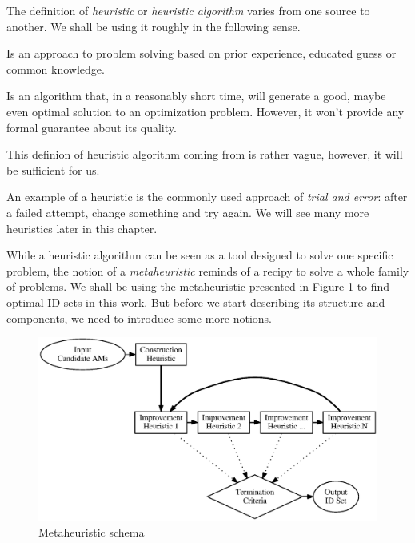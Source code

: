 The definition of \textit{heuristic} or \textit{heuristic algorithm} varies from one source to another. We shall be using it roughly in the following sense.

\begin{define}[Heuristic]
	Is an approach to problem solving based on prior experience, educated guess or common knowledge.
\end{define}

\begin{define}
	Is an algorithm that, in a reasonably short time, will generate a good, maybe even optimal solution to an optimization problem. However, it won’t provide any formal guarantee about its quality.
\end{define} 

This definion of heuristic algorithm coming from \cite{heu-lecture} is rather vague, however, it will be sufficient for us.

An example of a heuristic is the commonly used approach of \textit{trial and error}: after a failed attempt, change something and try again. We will see many more heuristics later in this chapter.

While a heuristic algorithm can be seen as a tool designed to solve one specific problem, the notion of a \textit{metaheuristic} reminds of a recipy to solve a whole family of problems. We shall be using the metaheuristic presented in Figure \ref{image-metaheuristic} to find optimal ID sets in this work. But before we start describing its structure and components, we need to introduce some more notions.

\begin{figure}
  \caption{Metaheuristic schema}
  \label{image-metaheuristic}
  \centering
    \includegraphics[width=\textwidth]{images/metaheuristic}
\end{figure}

